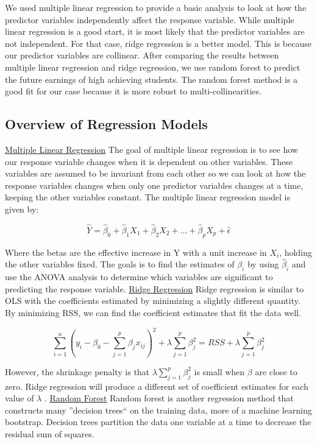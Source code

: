 \documentclass{article}
\begin{document}
We used multiple linear regression to provide a basic analysis to look at how the predictor variables independently affect the response variable.  
While multiple linear regression is a good start, it is most likely that the predictor variables are not independent.  For that case, ridge regression is a better model.  This is because our predictor variables are collinear.  
After comparing the results between multiple linear regression and ridge regression, we use random forest to predict the future earnings of high achieving students.  The random forest method is a good fit for our case because it is more robust to multi-collinearities. 


\subsection{Overview of Regression Models}

\underline{Multiple Linear Regression} \newline
The goal of multiple linear regression is to see how our response variable changes when it is dependent on other variables.  These variables are assumed to be invariant from each other so we can look at how the response variables changes when only one predictor variables changes at a time, keeping the other variables constant.  The multiple linear regression model is given by:

$$\hat Y = \hat \beta_0 + \hat \beta_1 X_1 + \hat \beta_2 X_2 + \dots + \hat \beta_p X_p + \hat \epsilon$$

Where the betas are the effective increase in Y with a unit increase in $X_i$, holding the other variables fixed.  
The goals is to find the estimates of $\beta_i$ by using $\hat \beta_i$ and use the ANOVA analysis to determine which variables are significant to predicting the response variable.
\newline
\newline
\underline{Ridge Regression}\newline
Ridge regression is similar to OLS with the coefficients estimated by minimizing a slightly different quantity.  By minimizing RSS, we can find the coefficient estimates that fit the data well. 

$$\sum_{i=1}^{n}(y_i-\beta_0-\sum_{j=1}^{p}\beta_jx_{ij})^2+\lambda\sum_{j=1}^{p}\beta_j^2 = RSS + \lambda\sum_{j=1}^{p}\beta_j^{2}$$ 

However, the shrinkage penalty is that $\lambda\sum_{j=1}^{p}\beta_j^{2}$ is small when $\beta$ are close to zero. Ridge regression will produce a different set of coefficient estimates for each value of $\lambda$ .
\newline
\newline
\underline{Random Forest}\newline
Random forest is another regression method that constructs many ''decision trees`` on the training data, more of a machine learning bootstrap.  Decision trees partition the data one variable at a time to decrease the residual sum of squares. 
\end{document}
